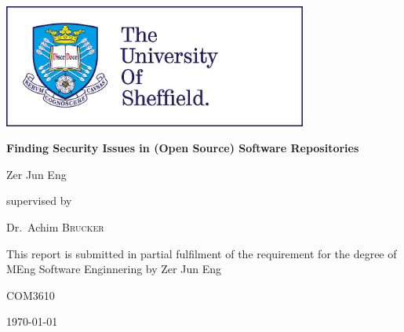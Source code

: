 \documentclass[12pt, a4paper]{report}
\begin{document}
\begin{titlepage}
	\centering
	\includegraphics[width=10cm]{tuos_logo}\par\vspace{1cm}
	\vspace{1cm}

	{\huge\bfseries Finding Security Issues in (Open Source) Software Repositories\par}
	\vspace{1cm}

	{\Large Zer Jun Eng\par}
	\vspace{1cm}

	supervised by\par Dr.~Achim \textsc{Brucker}
	\vfill

	{This report is submitted in partial fulfilment of the requirement for the degree of MEng Software
		Enginnering by Zer Jun Eng}
	\vfill

	{\large COM3610}
	\vfill

	{\large \today}
\end{titlepage}



\end{document}
